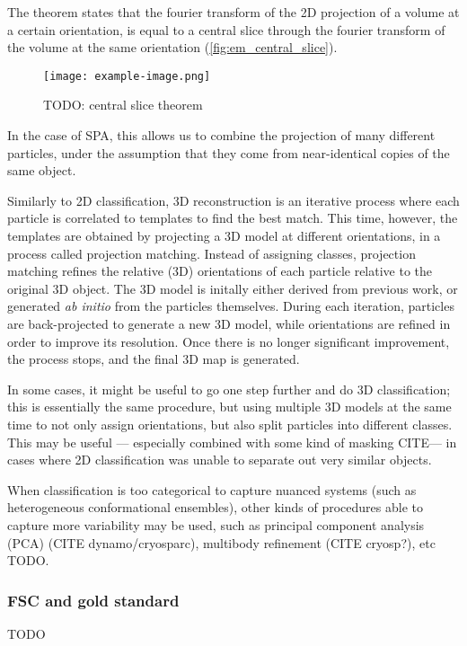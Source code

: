 The theorem states that the fourier transform of the 2D projection of a volume at a certain orientation, is equal to a central slice through the fourier transform of the volume at the same orientation (\autoref{fig:em_central_slice}).

\begin{figure}[ht]
    \centering
    \texttt{[image: example-image.png]}
    \caption{TODO: central slice theorem}
    \label{fig:em_central_slice}
\end{figure}

In the case of SPA, this allows us to combine the projection of many different particles, under the assumption that they come from near-identical copies of the same object.

Similarly to 2D classification, 3D reconstruction is an iterative process where each particle is correlated to templates to find the best match.
This time, however, the templates are obtained by projecting a 3D model at different orientations, in a process called projection matching.
Instead of assigning classes, projection matching refines the relative (3D) orientations of each particle relative to the original 3D object.
The 3D model is initally either derived from previous work, or generated \textit{ab initio} from the particles themselves.
During each iteration, particles are back-projected to generate a new 3D model, while orientations are refined in order to improve its resolution.
Once there is no longer significant improvement, the process stops, and the final 3D map is generated.

In some cases, it might be useful to go one step further and do 3D classification; this is essentially the same procedure, but using multiple 3D models at the same time to not only assign orientations, but also split particles into different classes.
This may be useful --- especially combined with some kind of masking CITE--- in cases where 2D classification was unable to separate out very similar objects.

When classification is too categorical to capture nuanced systems (such as heterogeneous conformational ensembles), other kinds of procedures able to capture more variability may be used, such as principal component analysis (PCA) (CITE dynamo/cryosparc), multibody refinement (CITE cryosp?), etc TODO.

\subsubsection{FSC and gold standard}
TODO

